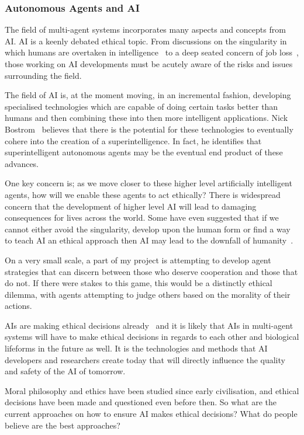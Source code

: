\documentclass[]{final_report}
\begin{document}
\subsubsection{Autonomous Agents and AI}
The field of multi-agent systems incorporates many aspects and concepts from AI. AI is a keenly debated ethical topic. From discussions on the singularity in which humans are overtaken in intelligence~\cite{bostrom2003ethical} to a deep seated concern of job loss~\cite{smith2014ai}, those working on AI developments must be acutely aware of the risks and issues surrounding the field.\par 
The field of AI is, at the moment moving, in an incremental fashion, developing specialised technologies which are capable of doing certain tasks better than humans and then combining these into then more intelligent applications. Nick Bostrom~\cite{bostrom2003ethical} believes that there is the potential for these technologies to eventually cohere into the creation of a superintelligence. In fact, he identifies that superintelligent autonomous agents may be the eventual end product of these advances.\par 
One key concern is; as we move closer to these higher level artificially intelligent agents, how will we enable these agents to act ethically? There is widespread concern that the development of higher level AI will lead to damaging consequences for lives across the world. Some have even suggested that if we cannot either avoid the singularity, develop upon the human form or find a way to teach AI an ethical approach then AI may lead to the downfall of humanity~\cite{vinge1993coming}.\par 
On a very small scale, a part of my project is attempting to develop agent strategies that can discern between those who deserve cooperation and those that do not. If there were stakes to this game, this would be a distinctly ethical dilemma, with agents attempting to judge others based on the morality of their actions.\par 
AIs are making ethical decisions already~\cite{watsoncancer} and it is likely that AIs in multi-agent systems will have to make ethical decisions in regards to each other and biological lifeforms in the future as well. It is the technologies and methods that AI developers and researchers create today that will directly influence the quality and safety of the AI of tomorrow.\par 
Moral philosophy and ethics have been studied since early civilisation, and ethical decisions have been made and questioned even before then. So what are the current approaches on how to ensure AI makes ethical decisions? What do people believe are the best approaches?
\end{document}
